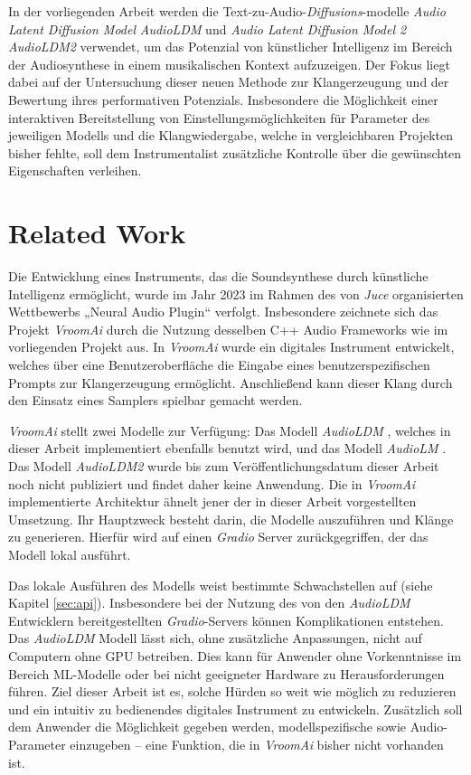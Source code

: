 \documentclass[
  a4paper,  %
  twoside,  %
  bibliography=totoc,
  headsepline,
  cleardoublepage=empty,
  parskip=half,
  draft=false
]{scrbook}
\begin{document}
In der vorliegenden Arbeit werden die Text-zu-Audio-\emph{Diffusions}-modelle \emph{Audio Latent Diffusion Model} \emph{AudioLDM} \cite{liu_audioldm_2023} und  \emph{Audio Latent Diffusion Model 2} \emph{AudioLDM2} \cite{liu_audioldm2_2023} verwendet, um das Potenzial von künstlicher Intelligenz im Bereich der Audiosynthese in einem musikalischen Kontext aufzuzeigen. Der Fokus liegt dabei auf der Untersuchung dieser neuen Methode zur Klangerzeugung und der Bewertung ihres performativen Potenzials. Insbesondere die Möglichkeit einer interaktiven Bereitstellung von Einstellungsmöglichkeiten für Parameter des jeweiligen Modells und die Klangwiedergabe, welche in vergleichbaren Projekten bisher fehlte, soll dem Instrumentalist zusätzliche Kontrolle über die gewünschten Eigenschaften verleihen.

\chapter{Related Work}


Die Entwicklung eines Instruments, das die Soundsynthese durch künstliche Intelligenz ermöglicht, wurde im Jahr 2023 im Rahmen des von \emph{Juce} \cite{noauthor_juce_nodate} organisierten Wettbewerbs „Neural Audio Plugin“ verfolgt. Insbesondere zeichnete sich das Projekt \emph{VroomAi} \cite{barney_hill_vroomai_2023} durch die Nutzung desselben C++ Audio Frameworks wie im vorliegenden Projekt aus. In \emph{VroomAi} wurde ein digitales Instrument entwickelt, welches über eine Benutzeroberfläche die Eingabe eines benutzerspezifischen Prompts zur Klangerzeugung ermöglicht. Anschließend kann dieser Klang durch den Einsatz eines Samplers spielbar gemacht werden.

\emph{VroomAi} stellt zwei Modelle zur Verfügung: Das Modell \emph{AudioLDM} \cite{liu_audioldm_2023}, welches in dieser Arbeit implementiert ebenfalls benutzt wird, und das Modell \emph{AudioLM} \cite{borsos_audiolm_2022}. Das Modell \emph{AudioLDM2} wurde bis zum Veröffentlichungsdatum dieser Arbeit noch nicht publiziert und findet daher keine Anwendung. Die in \emph{VroomAi} implementierte Architektur ähnelt jener der in dieser Arbeit vorgestellten Umsetzung. Ihr Hauptzweck besteht darin, die Modelle auszuführen und Klänge zu generieren. Hierfür wird auf einen \emph{Gradio} Server \cite{team_gradio_gradio_nodate} zurückgegriffen, der das Modell lokal ausführt.

Das lokale Ausführen des Modells weist bestimmte Schwachstellen auf (siehe Kapitel \ref{sec:api}). Insbesondere bei der Nutzung des von den \emph{AudioLDM} Entwicklern bereitgestellten \emph{Gradio}-Servers können Komplikationen entstehen. Das \emph{AudioLDM} Modell lässt sich, ohne zusätzliche Anpassungen, nicht auf Computern ohne GPU betreiben. Dies kann für Anwender ohne Vorkenntnisse im Bereich ML-Modelle oder bei nicht geeigneter Hardware zu Herausforderungen führen. Ziel dieser Arbeit ist es, solche Hürden so weit wie möglich zu reduzieren und ein intuitiv zu bedienendes digitales Instrument zu entwickeln. Zusätzlich soll dem Anwender die Möglichkeit gegeben werden, modellspezifische sowie Audio-Parameter einzugeben – eine Funktion, die in \emph{VroomAi} bisher nicht vorhanden ist.
\end{document}
